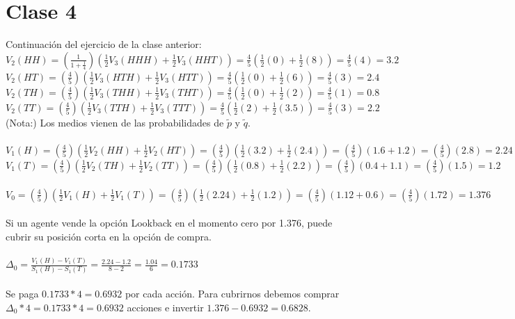 \documentclass{article}
\begin{document}
        \section{Clase 4}
        Continuación del ejercicio de la clase anterior:
        \\
        \(V_2(HH) = (\frac{1}{1 + \frac{1}{4}}) (\frac{1}{2} V_3(HHH) + \frac{1}{2} V_3(HHT))
        = \frac{4}{5} (\frac{1}{2} (0) + \frac{1}{2} (8))
        = \frac{4}{5} (4) = 3.2\)
        \\
        \(V_2(HT) = (\frac{4}{5}) (\frac{1}{2} V_3(HTH) + \frac{1}{2} V_3(HTT))
        = \frac{4}{5} (\frac{1}{2} (0) + \frac{1}{2} (6))
        = \frac{4}{5} (3) = 2.4\)
        \\
        \(V_2(TH) = (\frac{4}{5}) (\frac{1}{2} V_3(THH) + \frac{1}{2} V_3(THT))
        = \frac{4}{5} (\frac{1}{2} (0) + \frac{1}{2} (2))
        = \frac{4}{5} (1) = 0.8\)
        \\
        \(V_2(TT) = (\frac{4}{5}) (\frac{1}{2} V_3(TTH) + \frac{1}{2} V_3(TTT))
        = \frac{4}{5} (\frac{1}{2} (2) + \frac{1}{2} (3.5))
        = \frac{4}{5} (3) = 2.2\)
        \\
        (Nota:) Los medios vienen de las probabilidades de \(\tilde{p}\) y \(\tilde{q}\).
        \\
        \\
        \(V_1(H) = (\frac{4}{5}) (\frac{1}{2} V_2(HH) + \frac{1}{2} V_2(HT))
        = (\frac{4}{5}) (\frac{1}{2} (3.2) + \frac{1}{2} (2.4))
        = (\frac{4}{5}) (1.6 + 1.2) = (\frac{4}{5}) (2.8) = 2.24
        \)
        \\
        \(V_1(T) = (\frac{4}{5}) (\frac{1}{2} V_2(TH) + \frac{1}{2} V_2(TT))
        = (\frac{4}{5}) (\frac{1}{2} (0.8) + \frac{1}{2} (2.2))
        = (\frac{4}{5}) (0.4 + 1.1) = (\frac{4}{5}) (1.5) = 1.2
        \)
        \\
        \\
        \(V_0 = (\frac{4}{5}) (\frac{1}{2} V_1(H) + \frac{1}{2} V_1(T))
        = (\frac{4}{5}) (\frac{1}{2} (2.24) + \frac{1}{2} (1.2))
        = (\frac{4}{5}) (1.12 + 0.6) = (\frac{4}{5}) (1.72) = 1.376
        \)
        \\
        \\
        Si un agente vende la opción Lookback en el momento cero
        por 1.376, puede cubrir su posición corta en la opción
        de compra.
        \\
        \\
        \(\Delta_0 = \frac{V_1(H) - V_1(T)}{S_1(H) - S_1(T)} = \frac{2.24 - 1.2}{8 -2} = \frac{1.04}{6} = 0.1733\)
        \\
        \\
        Se paga \(0.1733 * 4 = 0.6932\) por cada acción.
        Para cubrirnos debemos comprar \(\Delta_0 * 4 = 0.1733 * 4 = 0.6932\) acciones e invertir \(1.376 - 0.6932 = 0.6828\).
\end{document}
